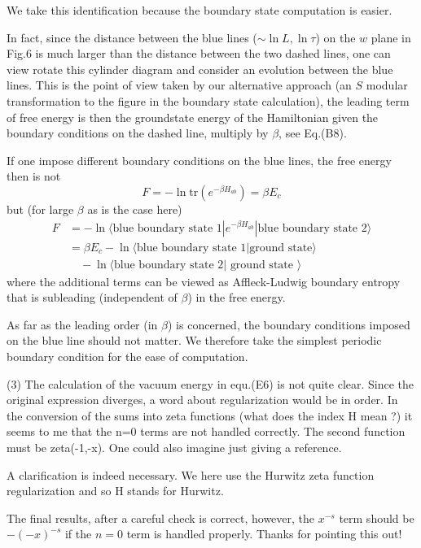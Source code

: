 \documentclass{article}
\newcommand{\reply}[1]{{\color{black}#1}}
\begin{document}
\reply{We take this identification because the boundary state computation is easier. 

In fact, since the distance between the blue lines ($\sim \ln L , \ln \tau$) on the $w$ plane in Fig.6 is much larger than the distance between the two dashed lines, one can view rotate this cylinder diagram and consider an evolution between the blue lines. This is the point of view taken by our alternative approach (an $S$ modular transformation to the figure in the boundary state calculation), the leading term of free energy is then the groundstate energy of the Hamiltonian given the boundary conditions on the dashed line, multiply by $\beta$, see Eq.(B8). 

If one impose different boundary conditions on the blue lines, the free energy then is not 
\begin{equation}
F = - \ln \text{tr}( e^{ - \beta H_{ab} } ) =  \beta  E_c
\end{equation}
but (for large $\beta$ as is the case here)
\begin{equation}
\begin{aligned}
F &= - \ln \langle \text{blue boundary state 1} | e^{ - \beta H_{ab}} | \text{blue boundary state 2} \rangle \\
&= \beta  E_c - \ln \langle \text{blue boundary state 1} | \text{ground state} \rangle \\
 &\quad - \ln \langle \text{blue boundary state 2} |\text{ ground state }\rangle                                                                                 
\end{aligned}
\end{equation}
where the additional terms can be viewed as Affleck-Ludwig boundary entropy that is subleading (independent of $\beta$) in the free energy. 

As far as the leading order (in $\beta$) is concerned, the boundary conditions imposed on the blue line should not matter. We therefore take the simplest periodic boundary condition for the ease of computation.}


(3) The calculation of the vacuum energy in equ.(E6) is not quite clear. Since the original expression diverges, a word about regularization would be in order. In the conversion of the sums into zeta functions (what does the index H mean ?) it seems to me that the n=0 terms are not handled correctly. The second function must be zeta(-1,-x). One could also imagine just giving a reference. 

\reply{
A clarification is indeed necessary. We here use the Hurwitz zeta function regularization and so H stands for Hurwitz. 

The final results, after a careful check is correct, however, the $x^{-s}$ term should be $-(-x)^{-s}$ if the $n = 0$ term is handled properly. Thanks for pointing this out!}
\end{document}
